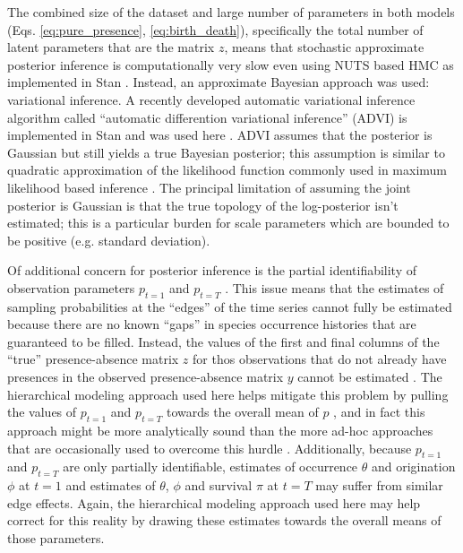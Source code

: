\documentclass[12pt,letterpaper]{article}
\begin{document}

The combined size of the dataset and large number of parameters in both models (Eqs. \ref{eq:pure_presence}, \ref{eq:birth_death}), specifically the total number of latent parameters that are the matrix \(z\), means that stochastic approximate posterior inference is computationally very slow even using NUTS based HMC as implemented in Stan \citep{StanDevelopmentTeam2016}. Instead, an approximate Bayesian approach was used: variational inference. A recently developed automatic variational inference algorithm called ``automatic differention variational inference'' (ADVI) is implemented in Stan and was used here \citep{Kucukelbir2015,StanDevelopmentTeam2016}. ADVI assumes that the posterior is Gaussian but still yields a true Bayesian posterior; this assumption is similar to quadratic approximation of the likelihood function commonly used in maximum likelihood based inference \citep{McElreath2016}. The principal limitation of assuming the joint posterior is Gaussian is that the true topology of the log-posterior isn't estimated; this is a particular burden for scale parameters which are bounded to be positive (e.g. standard deviation).

Of additional concern for posterior inference is the partial identifiability of observation parameters \(p_{t = 1}\) and \(p_{t = T}\) \citep{Royle2008}. This issue means that the estimates of sampling probabilities at the ``edges'' of the time series cannot fully be estimated because there are no known ``gaps'' in species occurrence histories that are guaranteed to be filled. Instead, the values of the first and final columns of the ``true'' presence-absence matrix \(z\) for thos observations that do not already have presences in the observed presence-absence matrix \(y\) cannot be estimated \citep{Royle2008}. The hierarchical modeling approach used here helps mitigate this problem by pulling the values of \(p_{t = 1}\) and \(p_{t = T}\) towards the overall mean of \(p\) \citep{Gelman2013d}, and in fact this approach might be more analytically sound than the more ad-hoc approaches that are occasionally used to overcome this hurdle \citep{Royle2008}. Additionally, because \(p_{t = 1}\) and \(p_{t = T}\) are only partially identifiable, estimates of occurrence \(\theta\) and origination \(\phi\) at \(t = 1\) and estimates of \(\theta\), \(\phi\) and survival \(\pi\) at \(t = T\) may suffer from similar edge effects. Again, the hierarchical modeling approach used here may help correct for this reality by drawing these estimates towards the overall means of those parameters.
\end{document}

